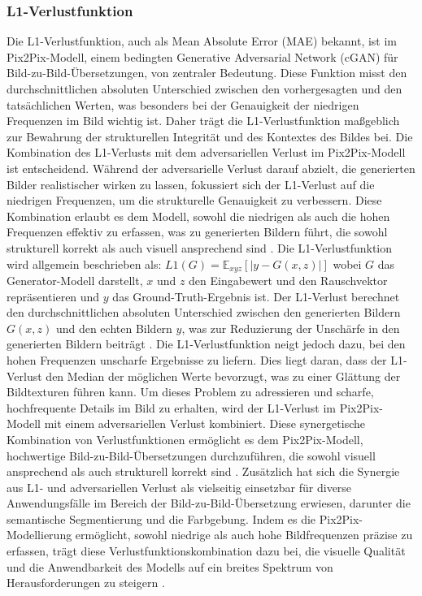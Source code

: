 \newpage

\subsubsection{L1-Verlustfunktion}

Die L1-Verlustfunktion, auch als Mean Absolute Error (MAE) bekannt, ist im Pix2Pix-Modell, einem bedingten Generative Adversarial Network (cGAN) für Bild-zu-Bild-Übersetzungen, von zentraler Bedeutung. Diese Funktion misst den durchschnittlichen absoluten Unterschied zwischen den vorhergesagten und den tatsächlichen Werten, was besonders bei der Genauigkeit der niedrigen Frequenzen im Bild wichtig ist. Daher trägt die L1-Verlustfunktion maßgeblich zur Bewahrung der strukturellen Integrität und des Kontextes des Bildes bei.
\newline
Die Kombination des L1-Verlusts mit dem adversariellen Verlust im Pix2Pix-Modell ist entscheidend. Während der adversarielle Verlust darauf abzielt, die generierten Bilder realistischer wirken zu lassen, fokussiert sich der L1-Verlust auf die niedrigen Frequenzen, um die strukturelle Genauigkeit zu verbessern. Diese Kombination erlaubt es dem Modell, sowohl die niedrigen als auch die hohen Frequenzen effektiv zu erfassen, was zu generierten Bildern führt, die sowohl strukturell korrekt als auch visuell ansprechend sind \cite{PhillipIsola.}.
\newline
Die L1-Verlustfunktion wird allgemein beschrieben als:
$L1(G) = \mathbb{E}_{xyz} \left[ \left| y - G(x, z) \right| \right]$
wobei $G$ das Generator-Modell darstellt, $x$ und $z$ den Eingabewert und den Rauschvektor repräsentieren und $y$ das Ground-Truth-Ergebnis ist. Der L1-Verlust berechnet den durchschnittlichen absoluten Unterschied zwischen den generierten Bildern $G(x,z)$ und den echten Bildern $y$, was zur Reduzierung der Unschärfe in den generierten Bildern beiträgt \cite{PhillipIsola.}.
\newline
Die L1-Verlustfunktion neigt jedoch dazu, bei den hohen Frequenzen unscharfe Ergebnisse zu liefern. Dies liegt daran, dass der L1-Verlust den Median der möglichen Werte bevorzugt, was zu einer Glättung der Bildtexturen führen kann. Um dieses Problem zu adressieren und scharfe, hochfrequente Details im Bild zu erhalten, wird der L1-Verlust im Pix2Pix-Modell mit einem adversariellen Verlust kombiniert. Diese synergetische Kombination von Verlustfunktionen ermöglicht es dem Pix2Pix-Modell, hochwertige Bild-zu-Bild-Übersetzungen durchzuführen, die sowohl visuell ansprechend als auch strukturell korrekt sind \cite{PhillipIsola.}. \newline
Zusätzlich hat sich die Synergie aus L1- und adversariellen Verlust als vielseitig einsetzbar für diverse Anwendungsfälle im Bereich der Bild-zu-Bild-Übersetzung erwiesen, darunter die semantische Segmentierung und die Farbgebung. Indem es die Pix2Pix-Modellierung ermöglicht, sowohl niedrige als auch hohe Bildfrequenzen präzise zu erfassen, trägt diese Verlustfunktionskombination dazu bei, die visuelle Qualität und die Anwendbarkeit des Modells auf ein breites Spektrum von Herausforderungen zu steigern \cite{PhillipIsola.}.

